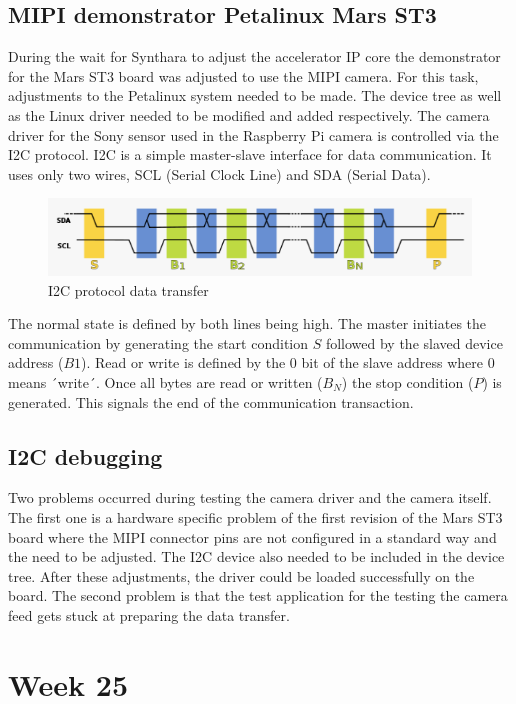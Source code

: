 \subsection{\acs{MIPI} demonstrator Petalinux Mars ST3}
During the wait for Synthara to adjust the accelerator \ac{IP} core the demonstrator for the Mars ST3 board was adjusted to use the \ac{MIPI} camera. For this task, adjustments to the Petalinux system needed to be made. The device tree as well as the Linux driver needed to be modified and added respectively. The camera driver for the Sony sensor used in the Raspberry Pi camera is controlled via the I2C protocol. I2C is a simple master-slave interface for data communication. It uses only two wires, SCL (Serial Clock Line) and SDA (Serial Data).
\begin{figure}[!htb]
	\centering
		\includegraphics[width=\textwidth]{bilder/I2C.png}
		\caption{I2C protocol data transfer}
		\label{fig:i2c}
\end{figure}
The normal state is defined by both lines being high. The master initiates the communication by generating the start condition $S$ followed by the slaved device address ($B1$). Read or write is defined by the $0$ bit of the slave address where $0$ means ´write´. Once all bytes are read or written ($B_N$) the stop condition ($P$) is generated. This signals the end of the communication transaction.
\subsection{I2C debugging}
Two problems occurred during testing the camera driver and the camera itself. The first one is a hardware specific problem of the first revision of the Mars ST3 board where the \ac{MIPI} connector pins are not configured in a standard way and the need to be adjusted. The I2C device also needed to be included in the device tree. After these adjustments, the driver could be loaded successfully on the board. The second problem is that the test application for the testing the camera feed gets stuck at preparing the data transfer.

\section{Week 25}
